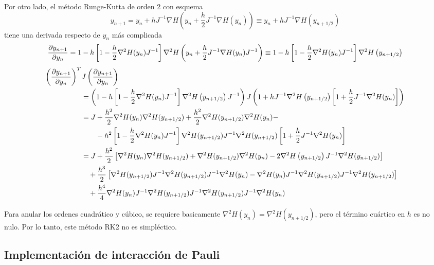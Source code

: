 Por otro lado, el método Runge-Kutta de orden 2 con esquema
\[ y_{n+1} = y_n + h J^{-1} \nabla H\left(y_n + \frac{h}{2} J^{-1} \nabla H(y_n) \right) \equiv y_n + h J^{-1} \nabla H\left(y_{n+1/2} \right) \]
tiene una derivada respecto de $y_n$ más complicada
\[ \frac{\partial y_{n+1}}{\partial y_n} =  1 - h\left[ 1 - \frac{h}{2} \nabla^2 H(y_n)J^{-1} \right]\nabla^2H\left(y_n + \frac{h}{2} J^{-1} \nabla H(y_n)J^{-1} \right) \equiv 1 - h\left[ 1 - \frac{h}{2} \nabla^2 H(y_n)J^{-1} \right]\nabla^2H\left(y_{n+1/2} \right) \]
\begin{align*}
 \left( \frac{\partial y_{n+1}}{\partial y_n} \right)^T &J \left( \frac{\partial y_{n+1}}{\partial y_n} \right) \\
 &= \left( 1 - h\left[ 1 - \frac{h}{2} \nabla^2 H(y_n)J^{-1} \right]\nabla^2H\left(y_{n+1/2} \right)J^{-1} \right) J \left(1 + hJ^{-1}\nabla^2H\left(y_{n+1/2} \right)\left[ 1 + \frac{h}{2} J^{-1} \nabla^2 H(y_n) \right] \right)\\
 &= J + \frac{h^2}{2} \nabla^2 H(y_n)\nabla^2H(y_{n+1/2}) + \frac{h^2}{2} \nabla^2H(y_{n+1/2})\nabla^2 H(y_n) -\\
 &\qquad - h^2\left[ 1 - \frac{h}{2} \nabla^2 H(y_n)J^{-1} \right]\nabla^2H(y_{n+1/2}) J^{-1}\nabla^2H(y_{n+1/2})\left[ 1 + \frac{h}{2} J^{-1} \nabla^2 H(y_n) \right] \\
 &= J + \frac{h^2}{2} \left[ \nabla^2 H(y_n)\nabla^2H(y_{n+1/2}) +  \nabla^2H(y_{n+1/2})\nabla^2 H(y_n) - 2\nabla^2H\left(y_{n+1/2} \right) J^{-1}\nabla^2H(y_{n+1/2}) \right] \\
 &\quad + \frac{h^3}{2} \left[ \nabla^2H(y_{n+1/2}) J^{-1}\nabla^2H(y_{n+1/2})J^{-1} \nabla^2 H(y_n) - \nabla^2 H(y_n)J^{-1}\nabla^2H(y_{n+1/2}) J^{-1}\nabla^2H(y_{n+1/2})\right] \\
 &\quad + \frac{h^4}{4} \nabla^2 H(y_n)J^{-1}\nabla^2H(y_{n+1/2}) J^{-1}\nabla^2H(y_{n+1/2})J^{-1}\nabla^2 H(y_n)
\end{align*}

Para anular los ordenes cuadrático y cúbico, se requiere basicamente $\nabla^2H(y_n) = \nabla^2H(y_{n+1/2})$, pero el término cuártico en $h$ es no nulo.
Por lo tanto, este método RK2 no es simpléctico.

\subsection{Implementación de interacción de Pauli}
